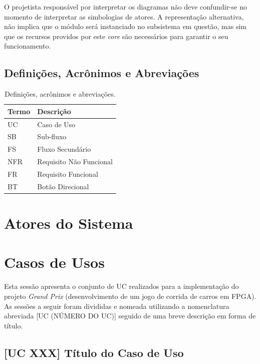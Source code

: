 \documentclass{article}
\begin{document}
  O projetista responsável por interpretar os diagramas não deve confundir-se no momento de interpretar as simbologias de atores. A representação alternativa, não implica que o módulo será instanciado no subsistema em questão, mas sim que os recursos providos por este \textit{core} são necessários para garantir o seu funcionamento.
  
  \subsection{Definições, Acrônimos e Abreviações}
  \FloatBarrier
    \begin{table}[H] 
      \begin{center}
        \caption{Definições, acrônimos e abreviações.}
        \begin{tabular}[pos]{|m{2cm} | m{8cm}|} 
          \hline 
          \cellcolor[gray]{0.9}\textbf{Termo} & \cellcolor[gray]{0.9}\textbf{Descrição} \\ \hline
          UC & Caso de Uso  \\ \hline
          SB & Sub-fluxo \\ \hline
          FS & Fluxo Secundário \\ \hline
          NFR & Requisito Não Funcional \\ \hline
          FR & Requisito Funcional \\ \hline
          BT & Botão Direcional \\
          \hline
        \end{tabular}
      \end{center}
    \label{tab:definicoes}
    \end{table}

  \section{Atores do Sistema}
  
  \section{Casos de Usos}
  Esta sessão apresenta o conjunto de UC realizados para a implementação do projeto \textit{Grand Prix} (desenvolvimento de um jogo de corrida de carros em FPGA). As sessões a seguir foram divididas e nomeada utilizando a nomenclatura abreviada [UC (NÚMERO DO UC)] seguido de uma breve descrição em forma de título.

  \subsection{[UC XXX] Título do Caso de Uso}
  
\end{document}
